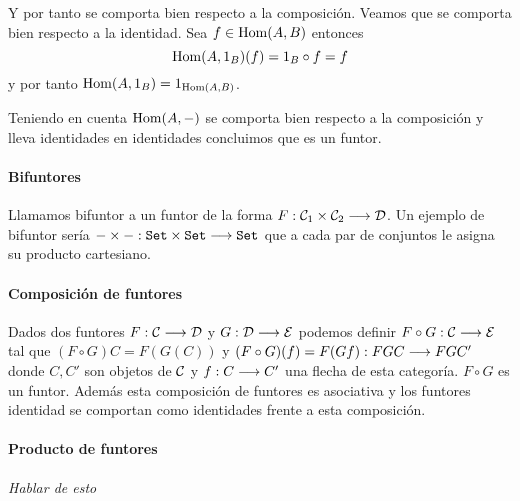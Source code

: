 Y por tanto se comporta bien respecto a la composición. Veamos que se
comporta bien respecto a la identidad. Sea $f \in \operatorname{Hom}(A, B)$ entonces
$$\operatorname{Hom}(A, 1_B)(f) = 1_B \circ f = f$$ y por tanto
$\operatorname{Hom}(A, 1_B) = 1_{\operatorname{Hom}(A, B)}$.

Teniendo en cuenta $\operatorname{Hom}(A, -)$ se comporta bien respecto a la
composición y lleva identidades en identidades concluimos que es
un funtor.

\paragraph{Bifuntores}
Llamamos bifuntor a un funtor de
la forma $F : \mathcal{C}_1\times\mathcal{C}_2\longrightarrow \mathcal{D}$. Un ejemplo de
bifuntor sería $-\times - : \texttt{Set}\times\texttt{Set}\longrightarrow \texttt{Set}$ que
a cada par de conjuntos le asigna su producto cartesiano.

\paragraph{Composición de funtores}
Dados dos funtores $F : \mathcal{C}\longrightarrow \mathcal{D}$ y $G: \mathcal{D}\longrightarrow \mathcal{E}$ podemos
definir $F \circ G : \mathcal{C}\longrightarrow \mathcal{E}$ tal que $(F\circ G)C = F(G(C))$
y $(F\circ G)(f) = F(Gf) : FGC\longrightarrow FGC'$ donde $C, C'$ son objetos
de $\mathcal{C}$ y $f: C\longrightarrow C'$ una flecha de esta categoría. $F\circ G$
es un funtor. Además esta composición de funtores es asociativa
y los funtores identidad se comportan como identidades frente
a esta composición.

\paragraph{Producto de funtores}
\textit{Hablar de esto}



